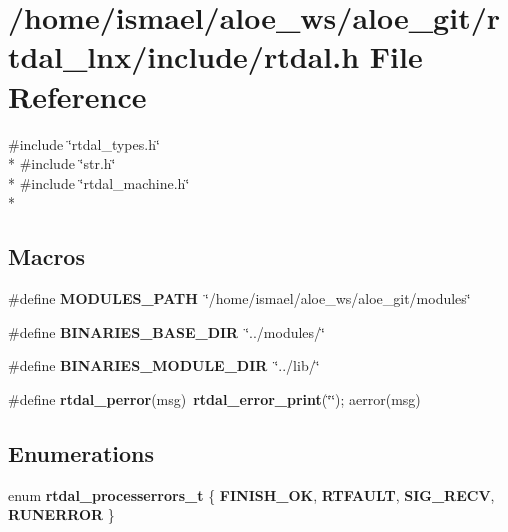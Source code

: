 \section{/home/ismael/aloe\-\_\-ws/aloe\-\_\-git/rtdal\-\_\-lnx/include/rtdal.h File Reference}
\label{rtdal_8h}
{\ttfamily \#include \char`\"{}rtdal\-\_\-types.\-h\char`\"{}}\\*
{\ttfamily \#include \char`\"{}str.\-h\char`\"{}}\\*
{\ttfamily \#include \char`\"{}rtdal\-\_\-machine.\-h\char`\"{}}\\*
\subsection*{Macros}
\begin{DoxyCompactItemize}
\item 
\#define {\bf M\-O\-D\-U\-L\-E\-S\-\_\-\-P\-A\-T\-H}~\char`\"{}/home/ismael/aloe\-\_\-ws/aloe\-\_\-git/modules\char`\"{}
\item 
\#define {\bf B\-I\-N\-A\-R\-I\-E\-S\-\_\-\-B\-A\-S\-E\-\_\-\-D\-I\-R}~\char`\"{}../modules/\char`\"{}
\item 
\#define {\bf B\-I\-N\-A\-R\-I\-E\-S\-\_\-\-M\-O\-D\-U\-L\-E\-\_\-\-D\-I\-R}~\char`\"{}../lib/\char`\"{}
\item 
\#define {\bf rtdal\-\_\-perror}(msg)~{\bf rtdal\-\_\-error\-\_\-print}(\char`\"{}\char`\"{}); aerror(msg)
\end{DoxyCompactItemize}
\subsection*{Enumerations}
\begin{DoxyCompactItemize}
\item 
enum {\bf rtdal\-\_\-processerrors\-\_\-t} \{ {\bf F\-I\-N\-I\-S\-H\-\_\-\-O\-K}, 
{\bf R\-T\-F\-A\-U\-L\-T}, 
{\bf S\-I\-G\-\_\-\-R\-E\-C\-V}, 
{\bf R\-U\-N\-E\-R\-R\-O\-R}
 \}
\end{DoxyCompactItemize}
